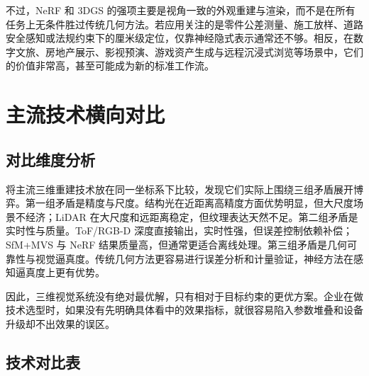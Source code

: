 \documentclass[12pt,a4paper]{ctexart}
\begin{document}
不过，NeRF 和 3DGS 的强项主要是视角一致的外观重建与渲染，而不是在所有任务上无条件胜过传统几何方法。若应用关注的是零件公差测量、施工放样、道路安全感知或法规约束下的厘米级定位，仅靠神经隐式表示通常还不够。相反，在数字文旅、房地产展示、影视预演、游戏资产生成与远程沉浸式浏览等场景中，它们的价值非常高，甚至可能成为新的标准工作流。

\section{主流技术横向对比}

\subsection{对比维度分析}

将主流三维重建技术放在同一坐标系下比较，发现它们实际上围绕三组矛盾展开博弈。第一组矛盾是精度与尺度。结构光在近距离高精度方面优势明显，但大尺度场景不经济；LiDAR 在大尺度和远距离稳定，但纹理表达天然不足。第二组矛盾是实时性与质量。ToF/RGB-D 深度直接输出，实时性强，但误差控制依赖补偿；SfM+MVS 与 NeRF 结果质量高，但通常更适合离线处理。第三组矛盾是几何可靠性与视觉逼真度。传统几何方法更容易进行误差分析和计量验证，神经方法在感知逼真度上更有优势。\cite{he2017toferror,cheng2018laser,mildenhall2020nerf,kerbl2023gaussian}

因此，三维视觉系统没有绝对最优解，只有相对于目标约束的更优方案。企业在做技术选型时，如果没有先明确具体看中的效果指标，就很容易陷入参数堆叠和设备升级却不出效果的误区。

\subsection{技术对比表}
\end{document}
